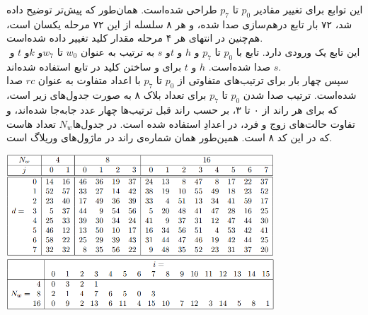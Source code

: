 این توابع برای تغییر مقادیر $ p_0 $ تا $ p_7 $ طراحی شده‌است. همان‌طور که پیش‌تر توضیح داده شد، ۷۲ بار تابع درهم‌سازی صدا شده‌،‌ و هر ۸ سلسله از این ۷۲ مرحله یکسان است، هم‌چنین در انتهای هر ۴ مرحله مقدار کلید تغییر   داده شده‌است.
\\
این تابع یک ورودی   دارد. تابع  \hyperref[subsec:TFBIG-ADDKEY]{} با ‌$ p_0 $ تا  $ p_7 $ و $ h $ و $ t $و ‌$ s $ به ترتیب به عنوان  $ w_0 $ تا $ w_7 $و $ k $و ‌$ t $ و ‌$ s $ صدا شده‌است. ‌$ h $ و $ t $ برای  و ساختن کلید در تابع  استفاده شده‌اند. \\
سپس   \hyperref[subsec:TFBIG-MIX8]{}چهار بار برای ترتیب‌های متفاوتی از ‌$ p_0 $ تا $ p_7 $ با اعداد متفاوت به عنوان $ rc $ صدا شده‌است. ترتیب صدا شدن $ p_0 $ تا $ p_7 $ برای تعداد بلاک ۸ به صورت جدول‌های زیر است،‌ که برای هر ‌‌راند از ۰ تا ۳، بر حسب راند قبل ترتیب‌ها چهار عدد جابه‌جا شده‌اند، و تفاوت حالت‌های زوج و فرد، در اعدادِ استفاده شده است. در جدول‌ها$  N_w$  تعداد هاست که در این کد ۸ است. همین‌طور  همان شماره‌‌ی راند در ماژول‌های وریلاگ است.
\begin{center}
	\includegraphics[width=10cm]{images/GoldenModelDocumentation/table_mix.png}
	\includegraphics[width= 10cm]{images/GoldenModelDocumentation/Mix2.png}
\end{center}


\subsection{}
\label{subsec:TFBIG-ADDKEY}

